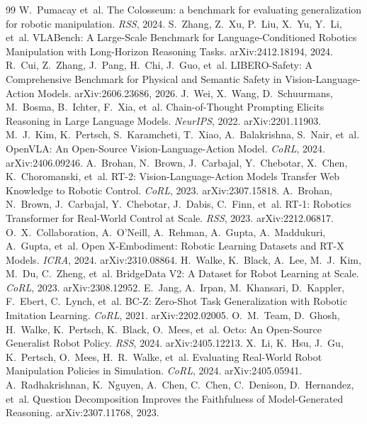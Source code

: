\documentclass{article}
\begin{document}
\begin{thebibliography}{99}
 W.~Pumacay et~al. The Colosseum: a benchmark for evaluating generalization for robotic manipulation. \emph{RSS}, 2024.
 S.~Zhang, Z.~Xu, P.~Liu, X.~Yu, Y.~Li, et~al. {VLABench}: A Large-Scale Benchmark for Language-Conditioned Robotics Manipulation with Long-Horizon Reasoning Tasks. arXiv:2412.18194, 2024.
 R.~Cui, Z.~Zhang, J.~Pang, H.~Chi, J.~Guo, et~al. {LIBERO-Safety}: A Comprehensive Benchmark for Physical and Semantic Safety in Vision-Language-Action Models. arXiv:2606.23686, 2026.
 J.~Wei, X.~Wang, D.~Schuurmans, M.~Bosma, B.~Ichter, F.~Xia, et~al. Chain-of-Thought Prompting Elicits Reasoning in Large Language Models. \emph{NeurIPS}, 2022. arXiv:2201.11903.
 M.~J.~Kim, K.~Pertsch, S.~Karamcheti, T.~Xiao, A.~Balakrishna, S.~Nair, et~al. OpenVLA: An Open-Source Vision-Language-Action Model. \emph{CoRL}, 2024. arXiv:2406.09246.
 A.~Brohan, N.~Brown, J.~Carbajal, Y.~Chebotar, X.~Chen, K.~Choromanski, et~al. RT-2: Vision-Language-Action Models Transfer Web Knowledge to Robotic Control. \emph{CoRL}, 2023. arXiv:2307.15818.
 A.~Brohan, N.~Brown, J.~Carbajal, Y.~Chebotar, J.~Dabis, C.~Finn, et~al. RT-1: Robotics Transformer for Real-World Control at Scale. \emph{RSS}, 2023. arXiv:2212.06817.
 O.~X.~Collaboration, A.~O'Neill, A.~Rehman, A.~Gupta, A.~Maddukuri, A.~Gupta, et~al. Open X-Embodiment: Robotic Learning Datasets and RT-X Models. \emph{ICRA}, 2024. arXiv:2310.08864.
 H.~Walke, K.~Black, A.~Lee, M.~J.~Kim, M.~Du, C.~Zheng, et~al. BridgeData V2: A Dataset for Robot Learning at Scale. \emph{CoRL}, 2023. arXiv:2308.12952.
 E.~Jang, A.~Irpan, M.~Khansari, D.~Kappler, F.~Ebert, C.~Lynch, et~al. BC-Z: Zero-Shot Task Generalization with Robotic Imitation Learning. \emph{CoRL}, 2021. arXiv:2202.02005.
 O.~M.~Team, D.~Ghosh, H.~Walke, K.~Pertsch, K.~Black, O.~Mees, et~al. Octo: An Open-Source Generalist Robot Policy. \emph{RSS}, 2024. arXiv:2405.12213.
 X.~Li, K.~Hsu, J.~Gu, K.~Pertsch, O.~Mees, H.~R.~Walke, et~al. Evaluating Real-World Robot Manipulation Policies in Simulation. \emph{CoRL}, 2024. arXiv:2405.05941.
 A.~Radhakrishnan, K.~Nguyen, A.~Chen, C.~Chen, C.~Denison, D.~Hernandez, et~al. Question Decomposition Improves the Faithfulness of Model-Generated Reasoning. arXiv:2307.11768, 2023.

\end{thebibliography}
\end{document}
